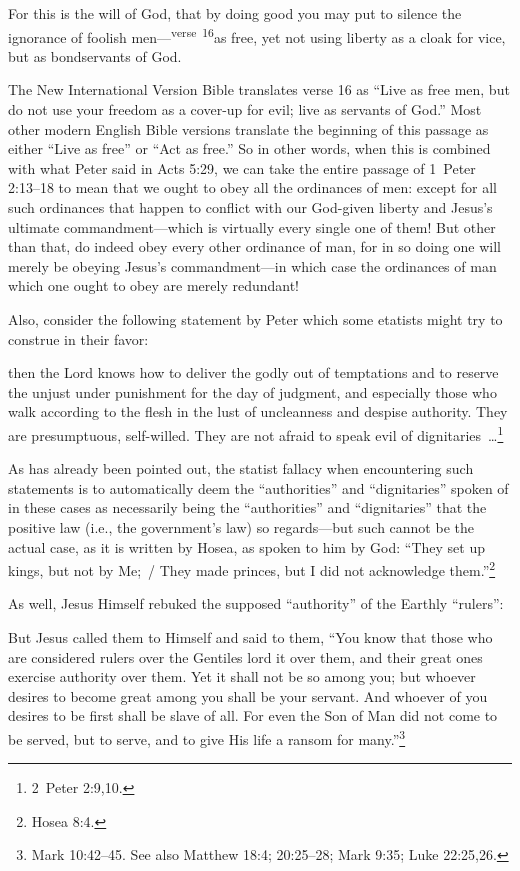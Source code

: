 \documentclass[letterpaper,12pt]{article}
\newenvironment{squote}
  {\small\quote}
  {\endquote\normalsize}
\begin{document}
\begin{squote}
For this is the will of God, that by doing good you may put to silence the ignorance of foolish men---\textsuperscript{verse~16}as free, yet not using liberty as a cloak for vice, but as bondservants of God.
\end{squote}

The New International Version Bible translates verse 16 as ``Live as free men, but do not use your freedom as a cover-up for evil; live as servants of God.'' Most other modern English Bible versions translate the beginning of this passage as either ``Live as free'' or ``Act as free.'' So in other words, when this is combined with what Peter said in Acts 5:29, we can take the entire passage of 1~Peter 2:13--18 to mean that we ought to obey all the ordinances of men: except for all such ordinances that happen to conflict with our God-given liberty and Jesus's ultimate commandment---which is virtually every single one of them! But other than that, do indeed obey every other ordinance of man, for in so doing one will merely be obeying Jesus's commandment---in which case the ordinances of man which one ought to obey are merely redundant!

Also, consider the following statement by Peter which some etatists might try to construe in their favor:

\begin{squote}
then the Lord knows how to deliver the godly out of temptations and to reserve the unjust under punishment for the day of judgment, and especially those who walk according to the flesh in the lust of uncleanness and despise authority. They are presumptuous, self-willed. They are not afraid to speak evil of dignitarie\mbox{s \ldots}\footnote{2~Peter 2:9,10.}
\end{squote}

As has already been pointed out, the statist fallacy when encountering such statements is to automatically deem the ``authorities'' and ``dignitaries'' spoken of in these cases as necessarily being the ``authorities'' and ``dignitaries'' that the positive law (i.e., the government's law) so regards---but such cannot be the actual case, as it is written by Hosea, as spoken to him by God: ``They set up kings, but not by Me;~/ They made princes, but I did not acknowledge them.''\footnote{Hosea 8:4.}

As well, Jesus Himself rebuked the supposed ``authority'' of the Earthly ``rulers'':

\begin{squote}
But Jesus called them to Himself and said to them, ``You know that those who are considered rulers over the Gentiles lord it over them, and their great ones exercise authority over them. Yet it shall not be so among you; but whoever desires to become great among you shall be your servant. And whoever of you desires to be first shall be slave of all. For even the Son of Man did not come to be served, but to serve, and to give His life a ransom for many.''\footnote{Mark 10:42--45. See also Matthew 18:4; 20:25--28; Mark 9:35; Luke 22:25,26.}
\end{squote}
\end{document}
